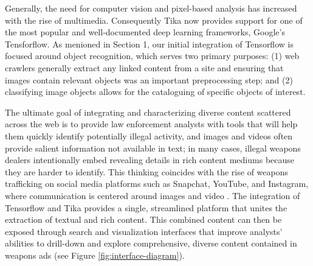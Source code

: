 Generally,  the need for computer vision and pixel-based analysis has increased with the rise of multimedia. Consequently Tika now provides support for one of the most popular and well-documented deep learning frameworks, Google's Tensforflow. As menioned in Section 1, our initial integration of Tensorflow is focused around object recognition, which serves two primary purposes: (1) web crawlers generally extract any linked content from a site and ensuring that images contain relevant objects was an important preprocessing step; and (2) classifying image objects allows for the cataloguing of specific objects of interest. 

The ultimate goal of integrating and characterizing diverse content scattered across the web is to provide law enforcement analysts with tools that will help them quickly identify potentially illegal activity, and images and videos often provide salient information not available in text; in many cases, illegal weapons dealers intentionally embed revealing details in rich content mediums because they are harder to identify. This thinking coincides with the rise of weapons trafficking on social media platforms such as Snapchat, YouTube, and Instagram, where communication is centered around images and video \cite{socialmedia}. The integration of Tensorflow and Tika provides a single, streamlined platform that unites the extraction of textual and rich content. This combined content can then be exposed through search and visualization interfaces that improve analysts' abilities to drill-down and explore comprehensive, diverse content contained in weapons ads (see Figure \ref{fig:interface-diagram}). 
